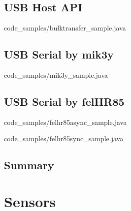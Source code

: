 \documentclass[openany]{mgr} %
\begin{document}

\section{USB Host API}


{code_samples/bulktransfer_sample.java}

\section{USB Serial by mik3y}


{code_samples/mik3y_sample.java}

\section{USB Serial by felHR85}


{code_samples/felhr85async_sample.java}


{code_samples/felhr85sync_sample.java}

\section{Summary}

\chapter{Sensors}
\end{document}
